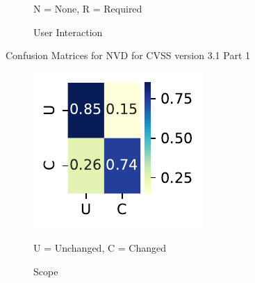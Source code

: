 \documentclass[12pt]{article}
\begin{document}
\begin{figure}[H]
\begin{subfigure}[t]{0.45\textwidth}
		\caption{User Interaction}
		\begin{tablenotes}
			\footnotesize
			\item \quad N = None, R = Required
		\end{tablenotes}
	\end{subfigure}

	\caption{\label{fig:mitre_31_confusion_matrices_1}Confusion Matrices for NVD for CVSS version 3.1 Part 1}
\end{figure}

\begin{figure}
	\centering

	\vspace{1em}

	\begin{subfigure}[t]{0.45\textwidth}
		\includegraphics[width=\textwidth]{./figures/confusion_matrices/scope_mitre.pdf}
		\caption{Scope}
		\begin{tablenotes}
			\footnotesize
			\item \quad U = Unchanged, C = Changed
		\end{tablenotes}
	\end{subfigure}
	\hfill
	\begin{subfigure}[t]{0.45\textwidth}

\end{subfigure}
\end{figure}
\end{document}
